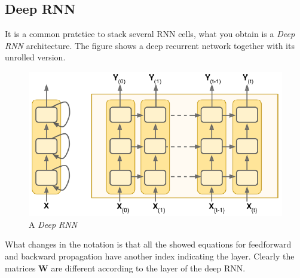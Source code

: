 \subsection{Deep RNN}
It is a common pratctice to stack several RNN cells, what you obtain is a \textit{Deep RNN} architecture. The figure shows a deep recurrent network together with its unrolled version.

\begin{figure}[h]
    \centering
    \includegraphics[scale=0.7]{img/rnn_deep.png}
    \caption{A \textit{Deep RNN}}
\end{figure}
\noindent
What changes in the notation is that all the showed equations for feedforward and backward propagation have another index indicating the layer. Clearly the matrices \textbf{W} are different according to the layer of the deep RNN.

